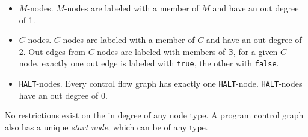 \documentclass[11pt]{article}
\begin{document}
\begin{itemize}
\item $M$-nodes.  $M$-nodes are labeled with a member of $M$ and have an out degree of 1.
\item $C$-nodes.  $C$-nodes are labeled with a member of $C$ and have an out degree of 2.  Out edges from $C$ nodes are labeled with members of $\mathbb{B}$, for a given $C$ node, exactly one out edge is labeled with \texttt{true}, the other with \texttt{false}.
\item \texttt{HALT}-nodes.  Every control flow graph has exactly one \texttt{HALT}-node.  \texttt{HALT}-nodes have an out degree of 0.
\end{itemize}

No restrictions exist on the in degree of any node type.  A program control graph also has a unique \emph{start node}, which can be of any type.
\end{document}
